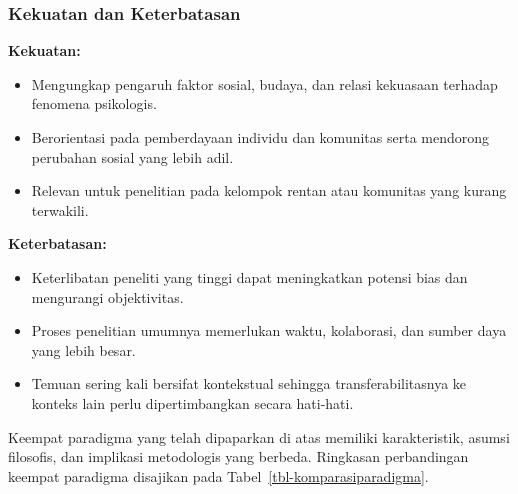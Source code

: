 \documentclass[
  indonesian,
  letterpaper,
  DIV=11,
  numbers=noendperiod]{scrreprt}
\providecommand{\tightlist}{%
  \setlength{\itemsep}{0pt}\setlength{\parskip}{0pt}}
\begin{document}
\subsubsection{Kekuatan dan
Keterbatasan}\label{kekuatan-dan-keterbatasan-3}

\textbf{Kekuatan:}

\begin{itemize}
\tightlist
\item
  Mengungkap pengaruh faktor sosial, budaya, dan relasi kekuasaan
  terhadap fenomena psikologis.
\item
  Berorientasi pada pemberdayaan individu dan komunitas serta mendorong
  perubahan sosial yang lebih adil.
\item
  Relevan untuk penelitian pada kelompok rentan atau komunitas yang
  kurang terwakili.
\end{itemize}

\textbf{Keterbatasan:}

\begin{itemize}
\tightlist
\item
  Keterlibatan peneliti yang tinggi dapat meningkatkan potensi bias dan
  mengurangi objektivitas.
\item
  Proses penelitian umumnya memerlukan waktu, kolaborasi, dan sumber
  daya yang lebih besar.
\item
  Temuan sering kali bersifat kontekstual sehingga transferabilitasnya
  ke konteks lain perlu dipertimbangkan secara hati-hati.
\end{itemize}

Keempat paradigma yang telah dipaparkan di atas memiliki karakteristik,
asumsi filosofis, dan implikasi metodologis yang berbeda. Ringkasan
perbandingan keempat paradigma disajikan pada
Tabel~\ref{tbl-komparasiparadigma}.
\end{document}
